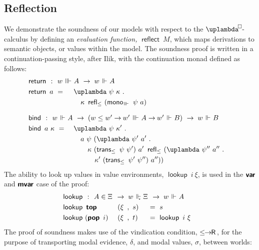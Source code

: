 \documentclass[submission,copyright,creativecommons,sharealike,backref=page]{eptcs}
\newcommand{\uplambdabox}{\uplambda^{\mkern-3mu\Box\mkern-3mu}}
\newcommand{\Xis}{\rlap{$\Xi$}\hphantom{A}}
\newcommand{\R}{\mathrel{\rlap{$\mkern.75mu\textsf{R}$}\hphantom{\subseteq}}}
\renewcommand{\:}{\mathop{\mkern3mu:\mkern3mu}}
\renewcommand{\.}{\mathop{\mkern3mu.\mkern3mu}}
\renewcommand{\;}{\mathop{;}}
\renewcommand{\,}{\mathop{,}}
\newcommand{\ee}{\mathrel{\mkern2mu\Vdash\mkern1mu}}
\newcommand{\ees}{\mathrel{\mkern2mu\Vdash_{\mkern-9mu\scriptscriptstyle{\star}}}}
\newcommand{\eee}{\mathrel{\mkern2mu\Vvdash\mkern1mu}}
\renewcommand{\r}{\mathrel{\rightarrow\mkern-1mu}}
\newcommand{\reflect}{\operatorname{\textsf{reflect}}}
\newcommand{\monoeee}{\operatorname{\textsf{mono}_{\eee}}}
\newcommand{\reflle}{\operatorname{\textsf{refl}_{\le}}}
\newcommand{\transle}{\operatorname{\textsf{trans}_{\le}}}
\newcommand{\lerR}{\operatorname{\le\mkern-1mu\r\mkern-1mu\R}}
\newcommand{\var}{\operatorname{\textsf{\textbf{var}}}}
\newcommand{\mvar}{\operatorname{\textsf{\textbf{mvar}}}}
\newcommand{\tops}{\operatorname{\textsf{\textbf{top}}}}
\newcommand{\pops}{\operatorname{\textsf{\textbf{pop}}}}
\newcommand{\return}{\operatorname{\textsf{return}}}
\newcommand{\bind}{\operatorname{\textsf{bind}}}
\newcommand{\lookup}{\operatorname{\textsf{lookup}}}
\theoremstyle{mystyle}
\begin{document}
\subsection{Reflection}

We demonstrate the soundness of our models with respect to the $\uplambdabox$-calculus by defining an \emph{evaluation function,} $\reflect~M$, which maps derivations to semantic objects, or values within the model.  The soundness proof is written in a continuation-passing style, after Ilik, with the continuation monad defined as follows:
\begin{alignat*}{3}
  & \return ~\:~ \rlap{$w \eee A ~\r~ w \ee A$}\\
  & \return~a      ~=~ && \uplambda~\psi~\kappa \.\\
  &                    && \quad \kappa~\reflle~(\monoeee~\psi~a)\\[.5\baselineskip]
  & \bind ~\:~ \rlap{$w \ee A ~\r~ (w \le w' \r w' \eee A \r w' \ee B) ~\r~ w \ee B$}\\
  & \bind~a~\kappa ~=~ && \uplambda~\psi~\kappa' \.\\
  &                    && \quad a~\psi~(\uplambda~\psi'~a' \.\\
  &                    && \quad\quad \kappa~(\transle~\psi~\psi')~a'~\reflle~(\uplambda~\psi''~a'' \.\\
  &                    && \quad\quad\quad \kappa'~(\transle~\psi'~\psi'')~a''))
\end{alignat*}
The ability to look up values in value environments, $\lookup~i~\xi$, is used in the $\var$ and $\mvar$ case of the proof:
\begin{alignat*}{3}
  & \lookup ~\:~ \rlap{$A \in \Xis ~\r~ w \ees \Xis ~\r~ w \ee A$}\\
  & \lookup~\tops     && ~(\xi~\,~s) && ~=~ s\\
  & \lookup~(\pops~i) && ~(\xi~\,~t) && ~=~ \lookup~i~\xi
\end{alignat*}
The proof of soundness makes use of the vindication condition, $\lerR$, for the purpose of transporting modal evidence, $\delta$, and modal values, $\sigma$, between worlds:
\end{document}
